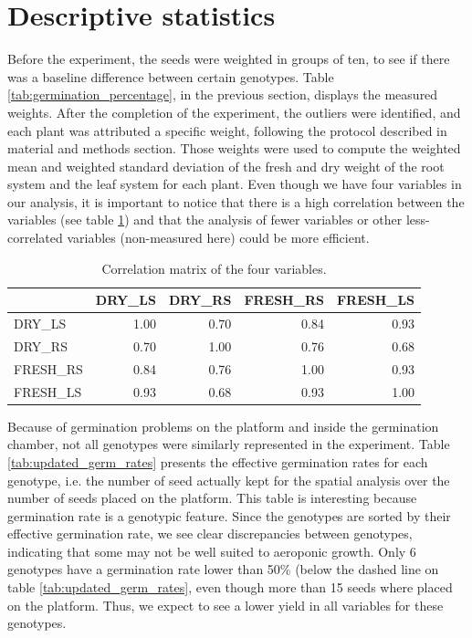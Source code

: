 \section{Descriptive statistics}
Before the experiment, the seeds were weighted in groups of ten, to see if there was a baseline difference between certain genotypes. Table \ref{tab:germination_percentage}, in the previous section, displays the measured weights.
After the completion of the experiment, the outliers were identified, and each plant was attributed a specific weight, following the protocol described in material and methods section. Those weights were used to compute the weighted mean and weighted standard deviation of the fresh and dry weight of the root system and the leaf system for each plant. Even though we have four variables in our analysis, it is important to notice that there is a high correlation between the variables (see table \ref{tab:var_correlation}) and that the analysis of fewer variables or other less-correlated variables (non-measured here) could be more efficient.\\

\begin{table}[ht]
\centering
 \caption{Correlation matrix of the four variables.}
\begin{tabular}{lrrrr}
  \hline
 & DRY\_LS & DRY\_RS & FRESH\_RS & FRESH\_LS \\ 
  \hline
DRY\_LS & 1.00 & 0.70 & 0.84 & 0.93 \\ 
  DRY\_RS & 0.70 & 1.00 & 0.76 & 0.68 \\ 
  FRESH\_RS & 0.84 & 0.76 & 1.00 & 0.93 \\ 
  FRESH\_LS & 0.93 & 0.68 & 0.93 & 1.00 \\ 
   \hline
\end{tabular}
\label{tab:var_correlation}
\end{table}

Because of germination problems on the platform and inside the germination chamber, not all genotypes were similarly represented in the experiment. Table \ref{tab:updated_germ_rates} presents the effective germination rates for each genotype, i.e. the number of seed actually kept for the spatial analysis over the number of seeds placed on the platform. This table is interesting because germination rate is a genotypic feature. Since the genotypes are sorted by their effective germination rate, we see clear discrepancies between genotypes, indicating that some may not be well suited to aeroponic growth. Only 6 genotypes have a germination rate lower than 50\% (below the dashed line on table \ref{tab:updated_germ_rates}, even though more than 15 seeds where placed on the platform. Thus, we expect to see a lower yield in all variables for these genotypes.\\

